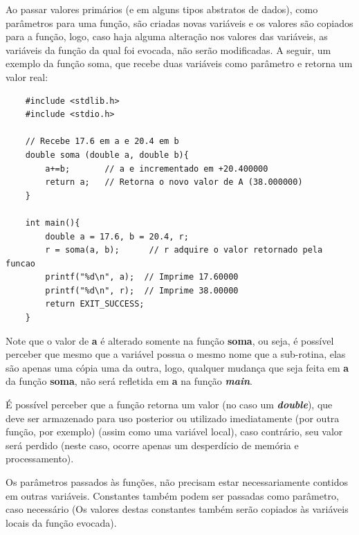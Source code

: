 \documentclass[12pt]{article}
\newcommand\tab[1][1cm]{\hspace*{#1}}
\begin{document}
\par\tab Ao passar valores primários (e em alguns tipos abstratos de dados), como parâmetros para uma função, são criadas novas variáveis e os valores são copiados para a função, logo, caso haja alguma alteração nos valores das variáveis, as variáveis da função da qual foi evocada, não serão modificadas. A seguir, um exemplo da função soma, que recebe duas variáveis como parâmetro e retorna um valor real:

\hspace{0.25cm}
\begin{lstlisting}
    #include <stdlib.h>
    #include <stdio.h>

    // Recebe 17.6 em a e 20.4 em b
    double soma (double a, double b){
        a+=b;       // a e incrementado em +20.400000
        return a;   // Retorna o novo valor de A (38.000000)
    }
    
    int main(){
        double a = 17.6, b = 20.4, r;
        r = soma(a, b);      // r adquire o valor retornado pela funcao
        printf("%d\n", a);  // Imprime 17.60000
        printf("%d\n", r);  // Imprime 38.00000
        return EXIT_SUCCESS;
    }
\end{lstlisting}

\par\tab Note que o valor de \textbf{a} é alterado somente na função \textbf{soma}, ou seja, é possível perceber que mesmo que a variável possua o mesmo nome que a sub-rotina, elas são apenas uma cópia uma da outra, logo, qualquer mudança que seja feita em \textbf{a} da função \textbf{soma}, não será refletida em \textbf{a} na função \textit{\textbf{main}}.

\hspace{0.25cm}
\begin{tcolorbox}[colback=yellow!5!white,colframe=yellow!75!black,title=Atenção!]
  \par\tab É possível perceber que a função retorna um valor (no caso um \textbf{\textit{double}}), que deve ser armazenado para uso posterior ou utilizado imediatamente (por outra função, por exemplo) (assim como uma variável local), caso contrário, seu valor será perdido (neste caso, ocorre apenas um desperdício de memória e processamento).
\end{tcolorbox}

\hspace{0.25cm}
\begin{tcolorbox}[colback=blue!5!white,colframe=blue!75!black,title=Dica!]
  \par\tab Os parâmetros passados às funções, não precisam estar necessariamente contidos em outras variáveis. Constantes também podem ser passadas como parâmetro, caso necessário (Os valores destas constantes também serão copiados às variáveis locais da função evocada).
\end{tcolorbox}
\end{document}
